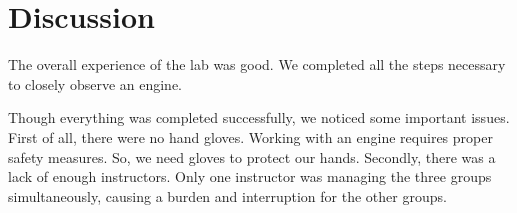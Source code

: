 \section{Discussion}

The overall experience of the lab was good. We completed all the steps necessary to closely observe an engine.

Though everything was completed successfully, we noticed some important issues. First of all, there were no hand gloves. Working with an engine requires proper safety measures. So, we need gloves to protect our hands. Secondly, there was a lack of enough instructors. Only one instructor was managing the three groups simultaneously, causing a burden and interruption for the other groups.